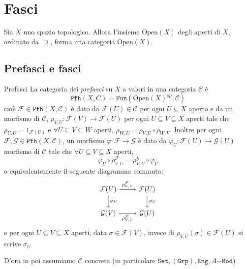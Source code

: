 \chapter{Fasci}

Sia \(X\) uno spazio topologico. Allora l'insieme \(\mathrm{Open}{(X)}\) degli
aperti di \(X\), ordinato da \(\supseteq\), forma una categoria
\(\mathrm{Open}{(X)}\).

\section{Prefasci e fasci}

\begin{definition}{Prefasci}
    La categoria dei \emph{prefasci} su \(X\) a valori in una categoria
    \(\mathcal{C}\) è 
    \[
      \mathtt{Pfh}{(X, C)} = \mathtt{Fun}{(\mathrm{Open}{(X)}^{op}, \mathcal{C})}
    \]
    cioè \(\mathcal{F} \in \mathtt{Pfh}{(X, \mathcal{C})}\) è dato da
    \(\mathcal{F}{(U)} \in \mathcal{C}\) per ogni \(U \subseteq X \) aperto e da
    un morfismo di \(\mathcal{C}\), \(\rho_{V,U} : \mathcal{F}{(V)} \to
    \mathcal{F}{(U)}\) per ogni \(U \subseteq V \subseteq X  \) aperti tale che
    \(\rho_{U,U} = 1_{\mathcal{F}{(U)}} \) e \(\forall U \subseteq V \subseteq W
    \) aperti, \(\rho_{W, U} = \rho_{V, U} \circ \rho_{W, V} \). Inoltre per
    ogni \(\mathcal{F}, \mathcal{G} \in \mathtt{Pfh}{(X, \mathcal{C})}\), un
    morfismo \(\varphi  : \mathcal{F} \to \mathcal{G}\) è dato da \(\varphi_{U}
    : \mathcal{F}{(U)} \to \mathcal{G}{(U)}\) morfismo di \(\mathcal{C}\) tale
    che \(\forall U \subseteq V \subseteq X  \) aperti, 
    \[
      \varphi_U \circ \rho_{V,U} ^{\mathcal{F}} = \rho_{V, U} ^{\mathcal{G}}
      \circ \varphi_V
    \]
    o equivalentemente il seguente diagramma commuta:
\[\begin{tikzcd}
	{\mathcal{F}{(V)}} & {\mathcal{F}{(U)}} \\
    {\mathcal{G}{(V)}} & {\mathcal{G}{(U)}}
	\arrow["{\rho_{V,U} ^{\mathcal{F}}}", from=1-1, to=1-2]
	\arrow["\varphi_V", from=1-1, to=2-1]
	\arrow["\varphi_U", from=1-2, to=2-2]
	\arrow["\rho_{V,U} ^{\mathcal{F}}"', from=2-1, to=2-2]
\end{tikzcd}\]
    e per ogni \(U \subseteq V \subseteq X  \) aperti, data \(\sigma \in
    \mathcal{F}{(V)}\), invece di \(\rho_{V,U} {(\sigma)} \in \mathcal{F}{(U)}\)
    si scrive \(\sigma_{U}\) 
\end{definition}
D'ora in poi assumiamo \(\mathcal{C}\) concreta (in particolare \(\mathtt{Set},
{(\mathtt{Grp})}, \mathtt{Rng}, A\mathtt{-Mod}\))


